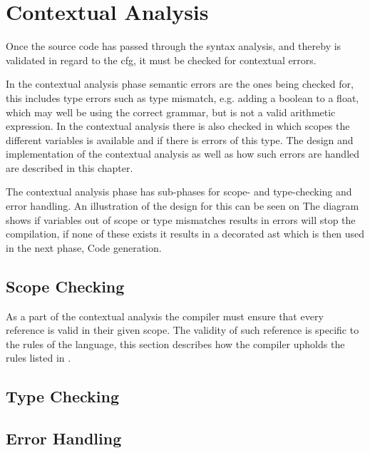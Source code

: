 \chapter{Contextual Analysis}
Once the source code has passed through the syntax analysis, and thereby is validated in regard to the \acrshort{cfg}, it must be checked for contextual errors.

In the contextual analysis phase semantic errors are the ones being checked for, this includes type errors such as type mismatch, e.g. adding a boolean to a float, which may well be using the correct grammar, but is not a valid arithmetic expression.
In the contextual analysis there is also checked in which scopes the different variables is available and if there is errors of this type.
The design and implementation of the contextual analysis as well as how such errors are handled are described in this chapter.

The contextual analysis phase has sub-phases for scope- and type-checking and error handling.
An illustration of the design for this can be seen on 
The diagram shows if variables out of scope or type mismatches results in errors will stop the compilation, if none of these exists it results in a decorated \acrshort{ast} which is then used in the next phase, Code generation.




%


\section{Scope Checking}
As a part of the contextual analysis the compiler must ensure that every reference is valid in their given scope.
The validity of such reference is specific to the rules of the language, this section describes how the compiler upholds the rules listed in .


\section{Type Checking}


\section{Error Handling}
